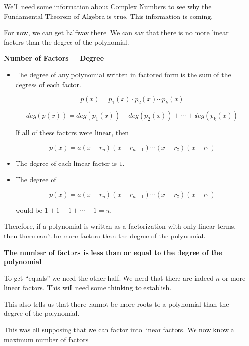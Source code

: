 \documentclass{ximera}
\begin{document}
We'll need some information about Complex Numbers to see why the Fundamental Theorem of Algebra is true. This information is coming. 

For now, we can get halfway there. We can say that there is no more linear factors than the degree of the polynomial.



\begin{idea} \textbf{\textcolor{blue!55!black}{Number of Factors = Degree}}  


\begin{itemize}
\item The degree of any polynomial written in factored form is the sum of the degress of each factor.

\[
 p(x) = p_1(x) \cdot p_2(x) \cdots p_k(x)
\]

\[
deg(p(x)) = deg(p_1(x)) + deg(p_2(x)) + \cdots + deg(p_k(x))
\]

If all of these factors were linear, then 

\[
 p(x) = a (x - r_n) (x - r_{n-1}) \cdots (x - r_2)  (x - r_1) 
\]

\item The degree of each linear factor is $1$. 

\item The degree of 

\[
p(x) = a (x - r_n) (x - r_{n-1}) \cdots (x - r_2)  (x - r_1) 
\]

would be $1 + 1 + 1 + \cdots + 1 = n$.
\end{itemize}



Therefore, if a polynomial is written as a factorization with only linear terms, then there can't be more factors than the degree of the polynomial. 

\begin{center}
\textbf{The number of factors is less than or equal to the degree of the polynomial}
\end{center}



To get ``equals'' we need the other half.  We need that there are indeed $n$ or more linear factors.  This will need some thinking to establish.

\end{idea}

This also tells us that there cannot be more roots to a polynomial than the degree of the polynomial. 


This was all supposing that we can factor into linear factors.  We now know a maximum number of factors. 
\end{document}

